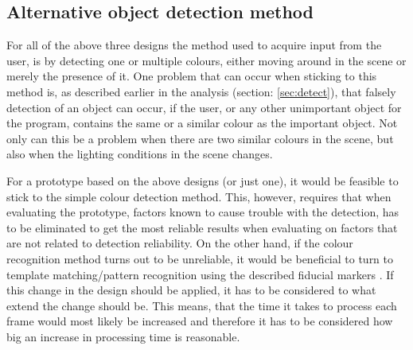 \subsection{Alternative object detection method}
For all of the above three designs the method used to acquire input from the user, is by detecting one or multiple colours, either moving around in the scene or merely the presence of it.  One problem that can occur when sticking to this method is, as described earlier in the analysis (section: \ref{sec:detect}), that falsely detection of an object can occur, if the user, or any other unimportant object for the program, contains the same or a similar colour as the important object. Not only can this be a problem when there are two similar colours in the scene, but also when the lighting conditions in the scene changes.
\bigskip

For a prototype based on the above designs (or just one), it would be feasible to stick to the simple colour detection method. This, however, requires that when evaluating the prototype, factors known to cause trouble with the detection, has to be eliminated to get the most reliable results when evaluating on factors that are not related to detection reliability. On the other hand, if the colour recognition method turns out to be unreliable, it would be beneficial to turn to template matching/pattern recognition using the described fiducial markers \parencite{Fiala2005}. If this change in the design should be applied, it has to be considered to what extend the change should be. This means, that the time it takes to process each frame would most likely be increased and therefore it has to be considered how big an increase in processing time is reasonable.